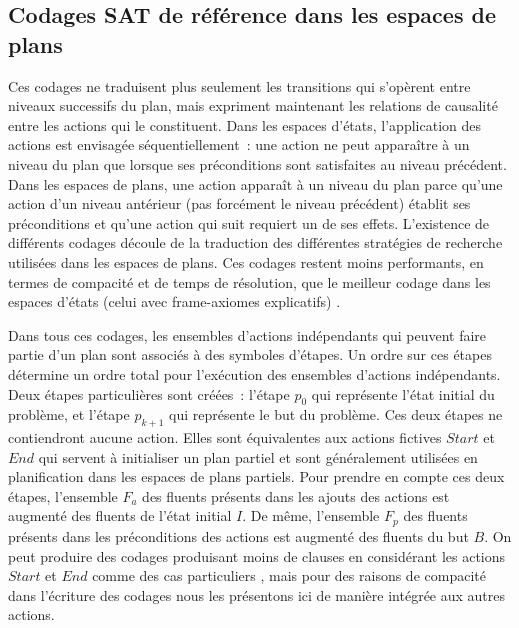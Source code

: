 %
%
\subsection{Codages SAT de référence dans les espaces de plans}


{\color{red}
Ces codages ne traduisent plus seulement les transitions qui s'opèrent entre
niveaux successifs du plan, mais expriment maintenant les relations de causalité
entre les actions qui le constituent. Dans les espaces d'états, l'application
des actions est envisagée séquentiellement~: une action ne peut apparaître à un
niveau du plan que lorsque ses préconditions sont satisfaites au niveau
précédent.  Dans les espaces de plans, une action apparaît à un niveau du plan
parce qu'une action d'un niveau antérieur (pas forcément le niveau précédent)
établit ses préconditions et qu'une action qui suit requiert un de ses effets.
L'existence de différents codages découle de la traduction des différentes
stratégies de recherche utilisées dans les espaces de plans. Ces codages restent
moins performants, en termes de compacité et de temps de résolution, que le
meilleur codage dans les espaces d'états (celui avec frame-axiomes explicatifs)
\cite{MK99}.

Dans tous ces codages, les ensembles d'actions indépendants qui peuvent faire
partie d'un plan sont associés à des symboles d'étapes. Un ordre sur ces étapes
détermine un ordre total pour l'exécution des ensembles d'actions indépendants.
Deux étapes particulières sont créées~: l'étape $p_0$ qui représente l'état
initial du problème, et l'étape $p_{k+1}$ qui représente le but du problème. Ces
deux étapes ne contiendront aucune action. Elles sont équivalentes aux actions
fictives $Start$ et $End$ qui servent à initialiser un plan partiel et sont généralement
utilisées en planification dans les espaces de plans partiels. Pour prendre en
compte ces deux étapes, l'ensemble $F_a$ des fluents présents dans les ajouts
des actions est augmenté des fluents de l'état initial $I$. De même, l'ensemble
$F_p$ des fluents présents dans les préconditions des actions est augmenté des
fluents du but $B$. On peut produire des codages produisant moins de clauses en
considérant les actions $Start$ et $End$ comme des cas particuliers
\cite{Vid01}, mais pour des raisons de compacité dans l'écriture des codages
nous les présentons ici de manière intégrée aux autres actions.

}
